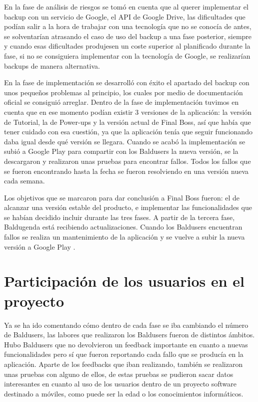 En la fase de análisis de riesgos se tomó en cuenta que al querer implementar el backup con un servicio de Google, el API de Google Drive,  las dificultades que podían salir a la hora de trabajar con una tecnología que no se conocía de antes, se solventarían atrasando el caso de uso del backup a una fase posterior, siempre y cuando esas dificultades produjesen un coste superior al planificado durante la fase, si no se consiguiera implementar con la tecnología de Google, se realizarían backups de manera alternativa.

En la fase de implementación se desarrolló con éxito el apartado del backup con unos pequeños problemas al principio, los cuales por medio de documentación oficial se consiguió arreglar. Dentro de la fase de implementación tuvimos en cuenta que en ese momento podían existir 3 versiones de la aplicación: la versión de Tutorial, la de Power-ups y la versión actual de Final Boss, así que había que tener cuidado con esa cuestión, ya que la aplicación tenía que seguir funcionando daba igual desde qué versión se llegara. Cuando se acabó la implementación se subió a Google Play para compartir con los Baldusers la nueva versión, se la descargaron y realizaron unas pruebas para encontrar fallos. Todos los fallos que se fueron encontrando hasta la fecha se fueron resolviendo en una versión nueva cada semana.

Los objetivos que se marcaron para dar conclusión a Final Boss fueron: el de alcanzar una versión estable del producto, e implementar las funcionalidades que se habían decidido incluir durante las tres fases. A partir de la tercera fase, Baldugenda está recibiendo actualizaciones. Cuando los Baldusers encuentran fallos se realiza un mantenimiento de la aplicación y se vuelve a subir la nueva versión a Google Play . 
\newpage
\section{Participación de los usuarios en el proyecto}
\label{secc:Participación de los usuarios en el proyecto}

Ya se ha ido comentando cómo dentro de cada fase se iba cambiando el número de Baldusers, las labores que realizaron los Baldusers fueron de distintos ámbitos. Hubo Baldusers que no devolvieron un feedback importante en cuanto a nuevas funcionalidades pero sí que fueron reportando cada fallo que se producía en la aplicación. 
Aparte de los feedbacks que iban realizando, también se realizaron unas pruebas con alguno de ellos, de estas pruebas se pudieron sacar datos interesantes en cuanto al uso de los usuarios dentro de un proyecto software destinado a móviles, como puede ser la edad o los conocimientos informáticos.

